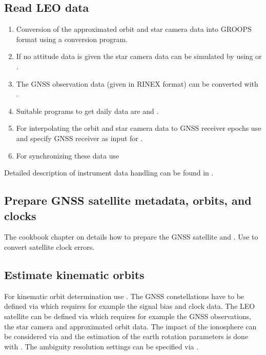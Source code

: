 \subsection{Read LEO data}
\begin{enumerate}
  \item Conversion of the approximated orbit and star camera data into GROOPS format using a conversion program.
  \item If no attitude data is given the star camera data can be simulated by using  or .
  \item The GNSS observation data (given in RINEX format) can be converted with .
  \item Suitable programs to get daily data are  and .
  \item For interpolating the orbit and star camera data to GNSS receiver epochs use  and specify GNSS receiver as input for
  .
  \item For synchronizing these data use 
\end{enumerate}
Detailed description of instrument data handling can be found in .

\subsection{Prepare GNSS satellite metadata, orbits, and clocks}
The cookbook chapter on  details how to prepare the GNSS satellite
 and .
Use  to convert satellite clock errors.

\subsection{Estimate kinematic orbits}

For kinematic orbit determination use . The GNSS constellations have to be defined via
 which requires for example the signal bias and clock data.
The LEO satellite can be defined via  which requires for example the
GNSS observations, the star camera and approximated orbit data. The impact of the ionosphere can be considered via
 and the estimation of the earth rotation parameters is done
with . The ambiguity resolution settings can be specified via
.

